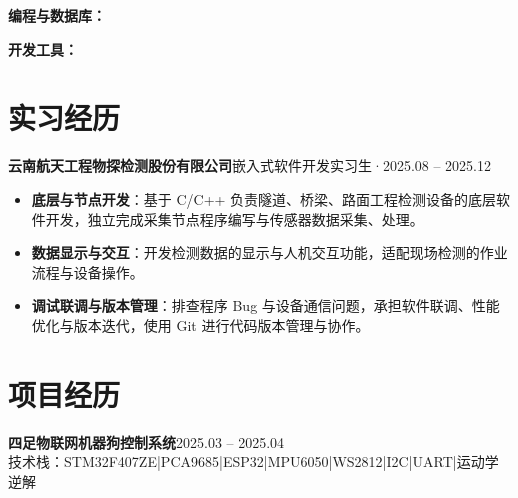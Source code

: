 \documentclass[10pt,a4paper]{article}
\newcommand{\projectblock}[3]{%
    {\bfseries\color{darktext}#1}\hfill{\color{graytext}#2}\\%
    {\small\color{graytext}#3}%
    \vspace{0.06em}%
}
\begin{document}
\vspace{2pt}

{\bfseries\color{primary}编程与数据库：}

\vspace{2pt}

{\bfseries\color{primary}开发工具：}

\section{\faBriefcase\hspace{0.4em}实习经历}

{\bfseries 云南航天工程物探检测股份有限公司}\hfill{\color{graytext}嵌入式软件开发实习生\hspace{0.3em}·\hspace{0.3em}2025.08 -- 2025.12}

\vspace{2pt}

\begin{itemize}[leftmargin=1.5em, itemsep=1.5pt, parsep=0pt, topsep=1.5pt]
    \item \textbf{底层与节点开发}：基于 C/C++ 负责隧道、桥梁、路面工程检测设备的底层软件开发，独立完成采集节点程序编写与传感器数据采集、处理。
    \item \textbf{数据显示与交互}：开发检测数据的显示与人机交互功能，适配现场检测的作业流程与设备操作。
    \item \textbf{调试联调与版本管理}：排查程序 Bug 与设备通信问题，承担软件联调、性能优化与版本迭代，使用 Git 进行代码版本管理与协作。
\end{itemize}

\vspace{0.06em}

\section{\faProjectDiagram\hspace{0.4em}项目经历}

\projectblock{四足物联网机器狗控制系统}{2025.03 -- 2025.04}{技术栈：STM32F407ZE\hspace{0.3em}|\hspace{0.3em}PCA9685\hspace{0.3em}|\hspace{0.3em}ESP32\hspace{0.3em}|\hspace{0.3em}MPU6050\hspace{0.3em}|\hspace{0.3em}WS2812\hspace{0.3em}|\hspace{0.3em}I2C\hspace{0.3em}|\hspace{0.3em}UART\hspace{0.3em}|\hspace{0.3em}运动学逆解}
\end{document}
